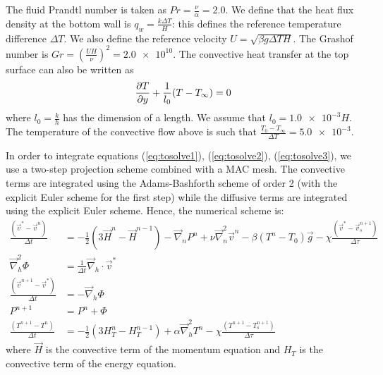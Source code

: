 \documentclass[a4paper,10pt]{scrartcl}
\newcommand\partiald[3]{\frac{\partial\ifnum#1>1 ^{#1}\fi #2}{\partial #3\ifnum#1>1 ^{#1}\fi}}
\newcommand\lapl{\vec{\nabla}^2}
\newcommand\grad{\vec{\nabla}}
\begin{document}
The fluid Prandtl number is taken as $Pr = \frac{\nu}{\alpha} = 2.0$. We define that the heat flux density at the bottom wall is $q_w = \frac{k\Delta T}{H}$: this defines the reference temperature difference $\Delta T$. We also define the reference velocity $U=\sqrt{\beta g\Delta TH}$. The Grashof number is $Gr = \left(\frac{UH}{\nu}\right)^2 = \num{2.0e10}$. The convective heat transfer at the top surface can also be written as
\begin{equation} \partiald{1}{T}{y} + \frac{1}{l_0}(T-T_\infty) = 0 \end{equation}
where $l_0 = \frac{k}{h}$ has the dimension of a length. We assume that $l_0 = \num{1.0e-3}H$. The temperature of the convective flow above is such that $\frac{T_0-T_\infty}{\Delta T} = \num{5.0e-3}$.

In order to integrate equations (\ref{eq:tosolve1}), (\ref{eq:tosolve2}), (\ref{eq:tosolve3}), we use a two-step projection scheme combined with a MAC mesh. The convective terms are integrated using the Adams-Bashforth scheme of order 2 (with the explicit Euler scheme for the first step) while the diffusive terms are integrated using the explicit Euler scheme. Hence, the numerical scheme is:
\begin{align}
    \frac{(\vec{v}^*-\vec{v}^n)}{\Delta t} &= -\frac{1}{2}(3\vec{H}^n-\vec{H}^{n-1}) - \grad_nP^n + \nu\lapl_n\vec{v}^n - \beta(T^n-T_0)\vec{g} - \chi\frac{(\vec{v}^*-\vec{v}_s^{n+1})}{\Delta\tau} \\
    \lapl_h\Phi &= \frac{1}{\Delta t}\vec{\nabla}_h\cdot\vec{v}^* \label{eq:poisson}\\
    \frac{(\vec{v}^{n+1}-\vec{v}^*)}{\Delta t} &= -\grad_h\Phi \\
    P^{n+1} &= P^n + \Phi \\
    \frac{(T^{n+1}-T^n)}{\Delta t} &= -\frac{1}{2}(3H^n_T - H^{n-1}_T) + \alpha\lapl_hT^n - \chi\frac{(T^{n+1}-T_s^{n+1})}{\Delta\tau}
\end{align}
where $\vec{H}$ is the convective term of the momentum equation and $H_T$ is the convective term of the energy equation.
\end{document}
